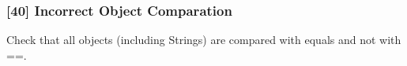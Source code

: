 \subsubsection{[40] Incorrect Object Comparation}
Check that all objects (including Strings) are compared with equals and not with ==.
